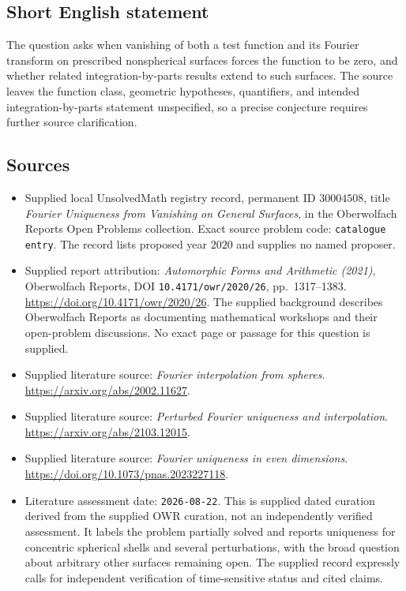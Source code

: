 \documentclass[11pt]{article}
\begin{document}
\subsection{Short English statement}
The question asks when vanishing of both a test function and its Fourier transform on prescribed nonspherical surfaces forces the function to be zero, and whether related integration-by-parts results extend to such surfaces. The source leaves the function class, geometric hypotheses, quantifiers, and intended integration-by-parts statement unspecified, so a precise conjecture requires further source clarification.
\subsection{Sources}
\begin{itemize}
\item Supplied local UnsolvedMath registry record, permanent ID \(30004508\), title \emph{Fourier Uniqueness from Vanishing on General Surfaces}, in the Oberwolfach Reports Open Problems collection. Exact source problem code: \texttt{catalogue entry}. The record lists proposed year \(2020\) and supplies no named proposer.
\item Supplied report attribution: \emph{Automorphic Forms and Arithmetic (2021)}, Oberwolfach Reports, DOI \texttt{10.4171/owr/2020/26}, pp.~1317--1383. \url{https://doi.org/10.4171/owr/2020/26}. The supplied background describes Oberwolfach Reports as documenting mathematical workshops and their open-problem discussions. No exact page or passage for this question is supplied.
\item Supplied literature source: \emph{Fourier interpolation from spheres}. \url{https://arxiv.org/abs/2002.11627}.
\item Supplied literature source: \emph{Perturbed Fourier uniqueness and interpolation}. \url{https://arxiv.org/abs/2103.12015}.
\item Supplied literature source: \emph{Fourier uniqueness in even dimensions}. \url{https://doi.org/10.1073/pnas.2023227118}.
\item Literature assessment date: \texttt{2026-08-22}. This is supplied dated curation derived from the supplied OWR curation, not an independently verified assessment. It labels the problem partially solved and reports uniqueness for concentric spherical shells and several perturbations, with the broad question about arbitrary other surfaces remaining open. The supplied record expressly calls for independent verification of time-sensitive status and cited claims.
\end{itemize}
\end{document}
